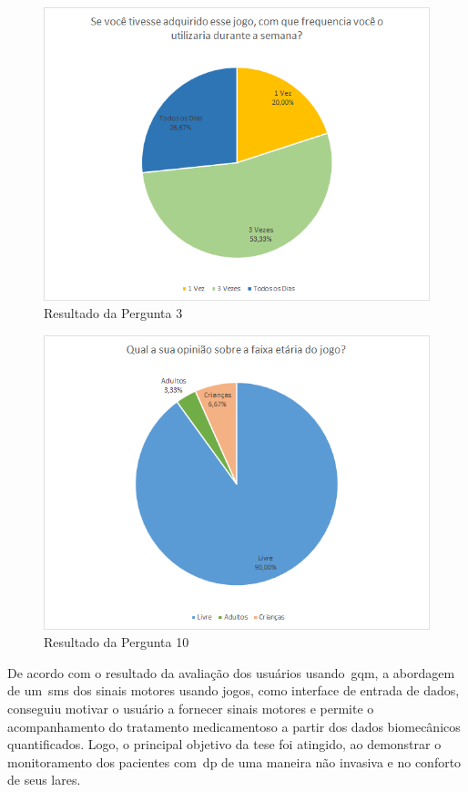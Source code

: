 \begin{figure}[!htb]
     \centering
     \includegraphics[scale=0.8]{./img/chart_3-.png}
     \caption{Resultado da Pergunta 3}
     \label{fig:question3}
\end{figure}


\begin{figure}[!htb]
     \centering
     \includegraphics[scale=0.8]{./img/chart_10-.png}
     \caption{Resultado da Pergunta 10}
     \label{fig:question10}
\end{figure}
\FloatBarrier

De acordo com o resultado da avaliação dos usuários usando~\ac{gqm}, a abordagem de um~\ac{sms} dos sinais motores usando jogos, como interface de entrada de dados, conseguiu motivar o usuário  a fornecer sinais motores e permite o acompanhamento do tratamento medicamentoso a partir dos dados biomecânicos quantificados. Logo, o principal objetivo da tese foi atingido, ao demonstrar o monitoramento dos pacientes com~\ac{dp} de uma maneira não invasiva e no conforto de seus lares.






